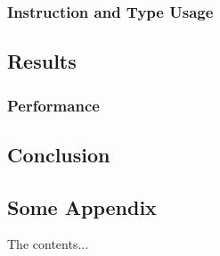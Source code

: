 \documentclass[english,a4paper]{article}
\begin{document}
\subsection{Instruction and Type Usage}


\section{Results}

\subsection{Performance}

\section{Conclusion}

\newpage{}
\begin{appendices}
\chapter{Some Appendix}
The contents...
\end{appendices}
\end{document}
